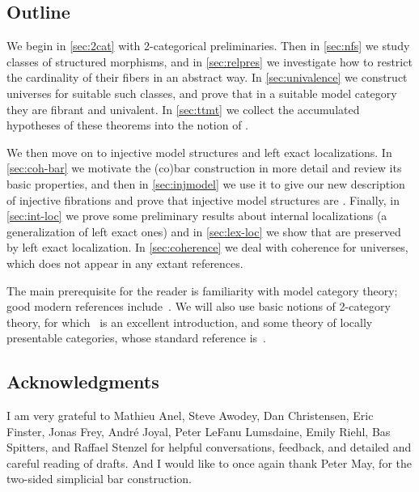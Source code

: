 \subsection{Outline}
\label{sec:outline}

We begin in \cref{sec:2cat} with 2-categorical preliminaries.
Then in \cref{sec:nfs} we study classes of structured morphisms, and in \cref{sec:relpres} we investigate how to restrict the cardinality of their fibers in an abstract way.
In \cref{sec:univalence} we construct universes for suitable such classes, and prove that in a suitable model category they are fibrant and univalent.
In \cref{sec:ttmt} we collect the accumulated hypotheses of these theorems into the notion of \ttmt.

We then move on to injective model structures and left exact localizations.
In \cref{sec:coh-bar} we motivate the (co)bar construction in more detail and review its basic properties, and then in \cref{sec:injmodel} we use it to give our new description of injective fibrations and prove that injective model structures are \ttmts.
Finally, in \cref{sec:int-loc} we prove some preliminary results about internal localizations (a generalization of left exact ones) and in \cref{sec:lex-loc} we show that \ttmts are preserved by left exact localization.
In \cref{sec:coherence} we deal with coherence for universes, which does not appear in any extant references. %

The main prerequisite for the reader is familiarity with model category theory; good modern references include~\cite{hovey:modelcats,hirschhorn:modelcats,mp:more-concise,riehl:cht}.
We will also use basic notions of 2-category theory, for which~\cite{steve:companion} is an excellent introduction, and some theory of locally presentable categories, whose standard reference is~\cite{ar:loc-pres}.

\subsection{Acknowledgments}
\label{sec:acknowledgments}

I am very grateful to Mathieu Anel, Steve Awodey, Dan Christensen, Eric Finster, Jonas Frey, Andr\'{e} Joyal, Peter LeFanu Lumsdaine, Emily Riehl, Bas Spitters, and Raffael Stenzel for helpful conversations, feedback, and detailed and careful reading of drafts.
And I would like to once again thank Peter May, for the two-sided simplicial bar construction.

